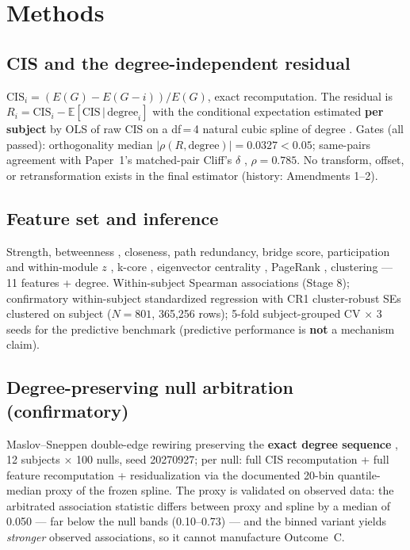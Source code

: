 \documentclass[11pt,a4paper]{article}
\newcommand{\del}{\delta}
\begin{document}
\section{Methods}
\subsection{CIS and the degree-independent residual}
$\mathrm{CIS}_i=(E(G)-E(G-i))/E(G)$, exact recomputation. The residual is
$R_i=\mathrm{CIS}_i-\mathbb{E}[\mathrm{CIS}\,|\,\mathrm{degree}_i]$ with
the conditional expectation estimated \textbf{per subject} by OLS of raw
CIS on a df\,=\,4 natural cubic spline of degree \cite{hastie2009}. Gates
(all passed): orthogonality median $|\rho(R,\mathrm{degree})|=0.0327<0.05$;
same-pairs agreement with Paper~1's matched-pair Cliff's $\del$
\cite{cliff1993}, $\rho=0.785$. No transform, offset, or retransformation
exists in the final estimator (history: Amendments 1--2).

\subsection{Feature set and inference}
Strength, betweenness \cite{freeman1977}, closeness, path redundancy,
bridge score, participation and within-module $z$
\cite{guimera2005}, k-core \cite{seidman1983}, eigenvector centrality
\cite{bonacich1972}, PageRank \cite{page1999}, clustering
\cite{watts1998} --- 11 features + degree. Within-subject Spearman
associations (Stage 8); confirmatory within-subject standardized
regression with CR1 cluster-robust SEs \cite{mackinnon1985} clustered on
subject ($N=801$, 365{,}256 rows); 5-fold subject-grouped CV $\times$ 3
seeds for the predictive benchmark (predictive performance is \textbf{not}
a mechanism claim).

\subsection{Degree-preserving null arbitration (confirmatory)}
Maslov--Sneppen double-edge rewiring preserving the \textbf{exact degree
sequence} \cite{maslov2002}, 12 subjects $\times$ 100 nulls, seed 20270927;
per null: full CIS recomputation + full feature recomputation +
residualization via the documented 20-bin quantile-median proxy of the
frozen spline. The proxy is validated on observed data: the arbitrated
association statistic differs between proxy and spline by a median of 0.050
--- far below the null bands (0.10--0.73) --- and the binned variant yields
\emph{stronger} observed associations, so it cannot manufacture Outcome~C.
\end{document}
